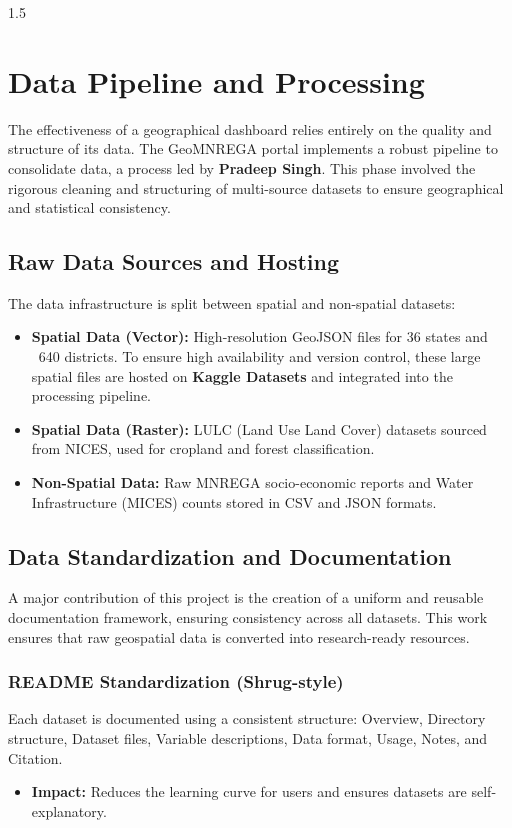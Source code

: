 \documentclass[12pt,a4paper]{report}
\begin{document}
\begin{spacing}{1.5}
\chapter{Data Pipeline and Processing}

The effectiveness of a geographical dashboard relies entirely on the quality and structure of its data. The GeoMNREGA portal implements a robust pipeline to consolidate data, a process led by \textbf{Pradeep Singh}. This phase involved the rigorous cleaning and structuring of multi-source datasets to ensure geographical and statistical consistency.

\section{Raw Data Sources and Hosting}
The data infrastructure is split between spatial and non-spatial datasets:
\begin{itemize}
    \item \textbf{Spatial Data (Vector):} High-resolution GeoJSON files for 36 states and ~640 districts. To ensure high availability and version control, these large spatial files are hosted on \textbf{Kaggle Datasets} and integrated into the processing pipeline.
    \item \textbf{Spatial Data (Raster):} LULC (Land Use Land Cover) datasets sourced from NICES, used for cropland and forest classification.
    \item \textbf{Non-Spatial Data:} Raw MNREGA socio-economic reports and Water Infrastructure (MICES) counts stored in CSV and JSON formats.
\end{itemize}

\section{Data Standardization and Documentation}
A major contribution of this project is the creation of a uniform and reusable documentation framework, ensuring consistency across all datasets. This work ensures that raw geospatial data is converted into research-ready resources.

\subsection{README Standardization (Shrug-style)}
Each dataset is documented using a consistent structure: Overview, Directory structure, Dataset files, Variable descriptions, Data format, Usage, Notes, and Citation.
\begin{itemize}
    \item \textbf{Impact:} Reduces the learning curve for users and ensures datasets are self-explanatory.
\end{itemize}


\end{spacing}
\end{document}
